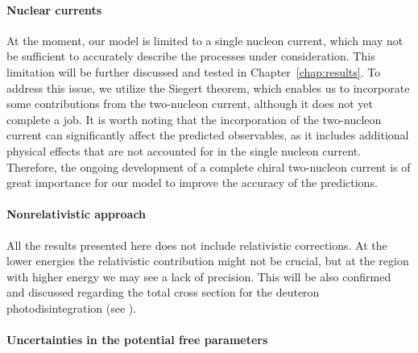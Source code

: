     \paragraph{Nuclear currents}
    At the moment, our model is limited to a single nucleon current, which may not be sufficient to accurately describe the processes under consideration.  This limitation will be further discussed and tested in
    Chapter~\ref{chap:results}. To address this issue, we utilize the Siegert theorem, which enables us to
    incorporate some contributions from the two-nucleon current, although it does not yet complete a job.
    It is worth noting
    that the incorporation of the two-nucleon current can significantly affect the predicted observables, as it
    includes additional physical effects that are not accounted for in the single nucleon current. Therefore, the
    ongoing development of a complete chiral two-nucleon current
    is of great importance for our model to improve the accuracy of the predictions.

    \paragraph{Nonrelativistic approach}
    All the results presented here does not include relativistic corrections.
    At the lower energies the relativistic contribution might not be crucial,
    but at the region with higher energy we may see a lack of precision.
    This will be also confirmed and discussed regarding the total cross section
    for the deuteron photodisintegration (see ).
    
    \paragraph{Uncertainties in the potential free parameters}

